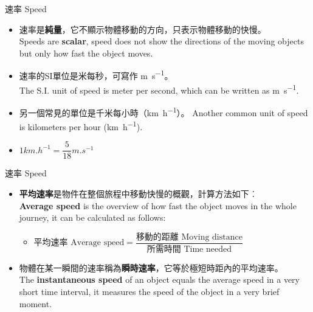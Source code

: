 \documentclass[beamer=true]{standalone}
\begin{document}
\begin{frame}{速率 Speed}
    \begin{itemize}
        \item 速率是\textbf{純量}，它不顯示物體移動的方向，只表示物體移動的快慢。 \\Speeds are \textbf{scalar}, speed does not show the directions of the moving objects but only how fast the object moves.
        \item 速率的SI單位是米每秒，可寫作 \unit{m.s^{-1}}。 \\The S.I. unit of speed is meter per second, which can be written as \unit{m.s^{-1}}.
        \item 另一個常見的單位是千米每小時（\unit{km.h^{-1}}）。 Another common unit of speed is kilometers per hour (\unit{km.h^{-1}}).
        \item []$1\unit{km.h^{-1}}=\dfrac{5}{18}\unit{m.s^{-1}}$

    \end{itemize}

\end{frame}
\begin{frame}{速率 Speed}
    \begin{itemize}
        \item \textbf{平均速率}是物件在整個旅程中移動快慢的概觀，計算方法如下︰ \\\textbf{Average speed} is the overview of how fast the object moves in the whole journey, it can be calculated as follows:
              \begin{itemize}
                  \item[] $\textrm{平均速率 Average speed}=\dfrac{\textrm{移動的距離 Moving distance}}{\textrm{所需時間 Time needed}}$
              \end{itemize}
        \item 物體在某一瞬間的速率稱為\textbf{瞬時速率}，它等於極短時距內的平均速率。\\ The \textbf{instantaneous speed} of an object equals the average speed in a very short time interval, it measures the speed of the object in a very brief moment.
    \end{itemize}

\end{frame}
\end{document}
